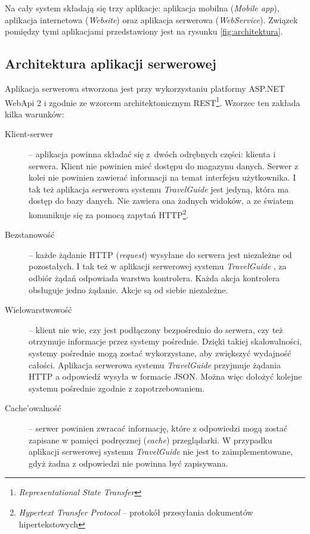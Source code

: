 \documentclass[a4paper]{book}
\newcommand{\appName}{\emph{TravelGuide} }
\begin{document}
		Na cały system składają się trzy aplikacje: aplikacja mobilna (\emph{Mobile app}), aplikacja internetowa (\emph{Website}) oraz aplikacja serwerowa (\emph{WebService}). Związek pomiędzy tymi aplikacjami przedstawiony jest na rysunku \ref{fig:architektura}. 
			
			\subsection{Architektura aplikacji serwerowej}
			
			
			
			Aplikacja serwerowa stworzona jest przy wykorzystaniu platformy ASP.NET WebApi 2 i zgodnie ze wzorcem architektonicznym REST\footnote{\emph{Representational State Transfer}}. Wzorzec ten zakłada kilka warunków:
			
			\begin{description}
				
				\item[Klient-serwer] -- aplikacja powinna składać się z~dwóch odrębnych części: klienta i serwera. Klient nie powinien mieć dostępu do magazynu danych. Serwer z kolei nie powinien zawierać informacji na temat interfejsu użytkownika. I tak też aplikacja serwerowa systemu \appName jest jedyną, która ma dostęp do bazy danych. Nie zawiera ona żadnych widoków, a ze światem 				komunikuje się za pomocą zapytań HTTP\footnote{\emph{Hypertext Transfer Protocol} – protokół przesyłania dokumentów hipertekstowych}.
				\item[Bezstanowość] -- każde żądanie HTTP (\emph{request}) wysyłane do serwera jest niezależne od pozostałych. I tak też w aplikacji serwerowej systemu \appName, za odbiór żądań odpowiada warstwa kontrolera. Każda akcja kontrolera obsługuje jedno żądanie. Akcje są od siebie niezależne.
				\item[Wielowarstwowość] -- klient nie wie, czy jest podłączony bezpośrednio do serwera, czy też otrzymuje informacje przez systemy pośrednie. Dzięki takiej skalowalności, systemy pośrednie mogą zostać wykorzystane, aby zwiększyć wydajność całości. Aplikacja serwerowa systemu \appName przyjmuje żądania HTTP a odpowiedź wysyła w formacie JSON. Można więc dołożyć kolejne systemu pośrednie zgodnie z zapotrzebowaniem. 
				\item[Cache'owalność] --  %
				serwer powinien zwracać informację, które z odpowiedzi mogą zostać zapisane w pamięci podręcznej (\emph{cache}) przeglądarki. W przypadku aplikacji serwerowej systemu \appName nie jest to zaimplementowane, gdyż żadna z odpowiedzi nie powinna być zapisywana.
				
			\end{description}
			
\end{document}
